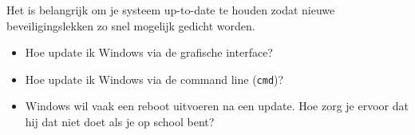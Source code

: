 Het is belangrijk om je systeem up-to-date te houden zodat nieuwe beveiligingslekken zo snel mogelijk gedicht worden.
\begin{itemize}
\item Hoe update ik Windows via de grafische interface?
\item Hoe update ik Windows via de command line (\texttt{cmd})?
\item Windows wil vaak een reboot uitvoeren na een update. Hoe zorg je ervoor dat hij dat niet doet als je op school bent?
\end{itemize}

